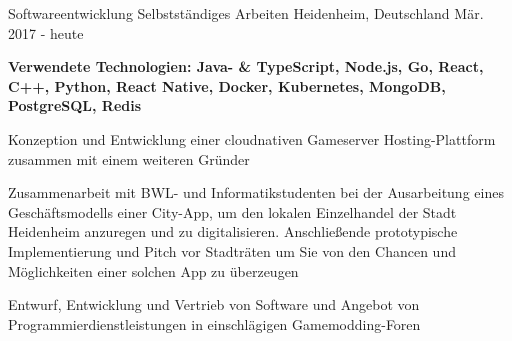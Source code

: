 \begin{cventries}

  \cventry
    {Softwareentwicklung} %
    {\faUser{} Selbstständiges Arbeiten} %
    {Heidenheim, Deutschland} %
    {Mär. 2017 - heute} %
    {
      \begin{cvitems} %
        {\scriptsize\textbf{Verwendete Technologien: Java- \& TypeScript, Node.js, Go, React, C++, Python, React Native, Docker, Kubernetes, MongoDB,\\ PostgreSQL, Redis}}
        \item {}
        \item {Konzeption und Entwicklung einer cloudnativen Gameserver Hosting-Plattform zusammen mit einem weiteren Gründer}
        \item {Zusammenarbeit mit BWL- und Informatikstudenten bei der Ausarbeitung eines Geschäftsmodells einer City-App, um den lokalen Einzelhandel der Stadt Heidenheim
        anzuregen und zu digitalisieren. Anschließende prototypische Implementierung und Pitch vor Stadträten um Sie von den Chancen und Möglichkeiten einer solchen App zu überzeugen}
        \item {Entwurf, Entwicklung und Vertrieb von Software und Angebot von Programmierdienstleistungen in einschlägigen Gamemodding-Foren}
      \end{cvitems}
    }

\end{cventries}
